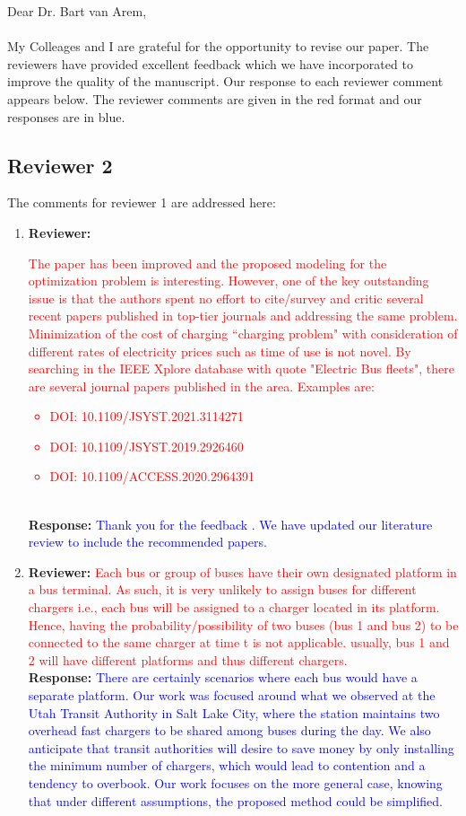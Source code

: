 \documentclass{article}
\newcommand\formatfeedback[2]
{%
	\textbf{Reviewer:} \textcolor{red}{#1} 
	\leavevmode\\[0.1in] \textbf{Response:} \textcolor{blue}{#2}
}
\begin{document}
\noindent Dear Dr. Bart van Arem, \\ \\
My Colleages and I are grateful for the opportunity to revise our paper. The reviewers have provided excellent feedback which we have incorporated to improve the quality of the manuscript. Our response to each reviewer comment appears below. The reviewer comments are given in the red format and our responses are in blue.

\subsection*{Reviewer 2}
The comments for reviewer 1 are addressed here:
\begin{enumerate}
	\item \formatfeedback{The paper has been improved and the proposed modeling for the optimization problem is interesting. However, one of the key outstanding issue is that the authors spent no effort to cite/survey and critic several recent papers published in top-tier journals and addressing the same problem. Minimization of the cost of charging ``charging problem" with consideration of different rates of electricity prices such as time of use is not novel. By searching in the IEEE Xplore database with quote "Electric Bus fleets", there are several journal papers published in the area. Examples are:
\begin{itemize}
	\item DOI: 10.1109/JSYST.2021.3114271
	\item DOI: 10.1109/JSYST.2019.2926460
	\item DOI: 10.1109/ACCESS.2020.2964391
\end{itemize}
}{Thank you for the feedback \emoji{peach}. We have updated our literature review to include the recommended papers.}
	\item \formatfeedback{Each bus or group of buses have their own designated platform in a bus terminal. As such, it is very unlikely to assign buses for different chargers i.e., each bus will be assigned to a charger located in its platform. Hence, having the probability/possibility of  two buses (bus 1 and bus 2) to be connected to the same charger at time t is not applicable. usually, bus 1 and 2 will have different platforms and thus different chargers.}{There are certainly scenarios where each bus would have a separate platform. Our work was focused around what we observed at the Utah Transit Authority in Salt Lake City, where the station maintains two overhead fast chargers to be shared among buses during the day. We also anticipate that transit authorities will desire to save money by only installing the minimum number of chargers, which would lead to contention and a tendency to overbook. Our work focuses on the more general case, knowing that under different assumptions, the proposed method could be simplified.}

\end{enumerate}
\end{document}

